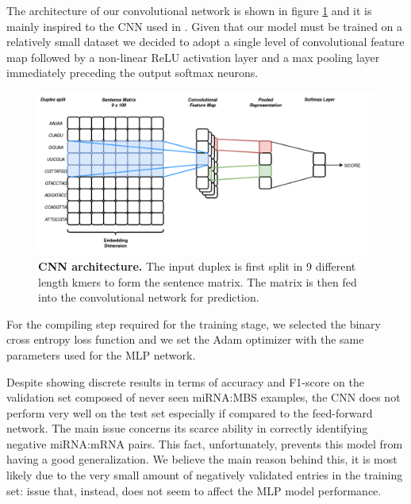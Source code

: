The architecture of our convolutional network is shown in figure \ref{fig:cnn} and it is mainly inspired to the CNN used in \cite{cnn_arch}. Given that our model must be trained on a relatively small dataset we decided to adopt a single level of convolutional feature map followed by a non-linear ReLU activation layer and a max pooling layer immediately preceding the output softmax neurons. 

\begin{figure}[hbt!]
	\centering
	\includegraphics[width=\textwidth, height=0.4\textheight]{Figures/cnn_arch}
	\caption{\textbf{CNN architecture.} The input duplex is first split in 9 different length kmers to form the sentence matrix. The matrix is then fed into the convolutional network for prediction.}
	\label{fig:cnn}
\end{figure}     

For the compiling step required for the training stage, we selected the binary cross entropy loss function and we set the Adam optimizer with the same parameters used for the MLP network.

Despite showing discrete results in terms of accuracy and F1-score on the validation set composed of never seen miRNA:MBS examples, the CNN does not perform very well on the test set especially if compared to the feed-forward network. The main issue
concerns its scarce ability in correctly identifying negative miRNA:mRNA pairs. This fact, unfortunately, prevents this model from having a good generalization. We believe the main reason behind this, it is most likely due to the very small amount of negatively validated entries in the training set: issue that, instead, does not seem to affect the MLP model performance.

  

